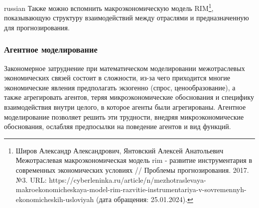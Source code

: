 \documentclass[9pt]{article}
\begin{document}
\begin{otherlanguage*}{russian}
Также можно вспомнить макроэкономическую модель RIM\footnote{Широв Александр Александрович, Янтовский Алексей Анатольевич Межотраслевая макроэкономическая модель rim - развитие инструментария в современных экономических условиях // Проблемы прогнозирования. 2017. №3. URL: https://cyberleninka.ru/article/n/mezhotraslevaya-makroekonomicheskaya-model-rim-razvitie-instrumentariya-v-sovremennyh-ekonomicheskih-usloviyah (дата обращения: 25.01.2024).}, показывающую структуру взаимодействий между отраслями и предназначенную для прогнозирования.
\subsubsection*{Агентное моделирование}
Закономерное затруднение при математическом моделировании межотраслевых экономических связей состоит в сложности, из-за чего приходится многие экономические явления предполагать экзогенно (спрос, ценообразование), а также агрегировать агентов, теряя микроэкономические обоснования и специфику взаимодействия внутри целого, в которое агенты были агрегированы. Агентное моделирование позволяет решить эти трудности, внедряя микроэкономические обоснования, ослабляя предпосылки на поведение агентов и вид функций.


\end{otherlanguage*}
\end{document}
